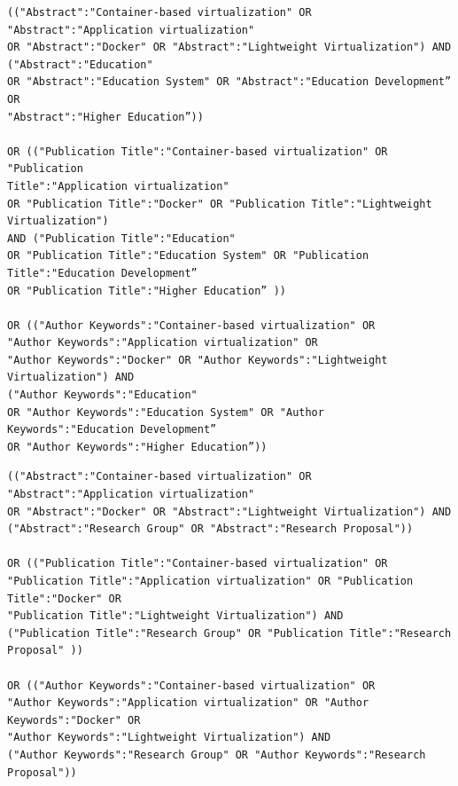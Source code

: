 \begin{tcolorbox}[
  colback=gray!5, 
  colframe=black!60, 
  title=Cadena de búsqueda en IEE para educación, 
  fonttitle=\bfseries, 
  sharp corners=south
]
\scriptsize %
\begin{verbatim}
(("Abstract":"Container-based virtualization" OR "Abstract":"Application virtualization" 
OR "Abstract":"Docker" OR "Abstract":"Lightweight Virtualization") AND ("Abstract":"Education" 
OR "Abstract":"Education System" OR "Abstract":"Education Development”  OR 
"Abstract":"Higher Education”)) 

OR (("Publication Title":"Container-based virtualization" OR "Publication 
Title":"Application virtualization" 
OR "Publication Title":"Docker" OR "Publication Title":"Lightweight Virtualization") 
AND ("Publication Title":"Education" 
OR "Publication Title":"Education System" OR "Publication Title":"Education Development”  
OR "Publication Title":"Higher Education” ))

OR (("Author Keywords":"Container-based virtualization" OR 
"Author Keywords":"Application virtualization" OR 
"Author Keywords":"Docker" OR "Author Keywords":"Lightweight Virtualization") AND 
("Author Keywords":"Education" 
OR "Author Keywords":"Education System" OR "Author Keywords":"Education Development”  
OR "Author Keywords":"Higher Education”))
\end{verbatim}
\end{tcolorbox}


\begin{tcolorbox}[
  colback=gray!5, 
  colframe=black!60, 
  title=Cadena de búsqueda en IEE para investigación, 
  fonttitle=\bfseries, 
  sharp corners=south
]
\scriptsize %
\begin{verbatim}
(("Abstract":"Container-based virtualization" OR "Abstract":"Application virtualization" 
OR "Abstract":"Docker" OR "Abstract":"Lightweight Virtualization") AND 
("Abstract":"Research Group" OR "Abstract":"Research Proposal")) 

OR (("Publication Title":"Container-based virtualization" OR 
"Publication Title":"Application virtualization" OR "Publication Title":"Docker" OR 
"Publication Title":"Lightweight Virtualization") AND 
("Publication Title":"Research Group" OR "Publication Title":"Research Proposal" ))

OR (("Author Keywords":"Container-based virtualization" OR 
"Author Keywords":"Application virtualization" OR "Author Keywords":"Docker" OR 
"Author Keywords":"Lightweight Virtualization") AND 
("Author Keywords":"Research Group" OR "Author Keywords":"Research Proposal"))
\end{verbatim}
\end{tcolorbox}

